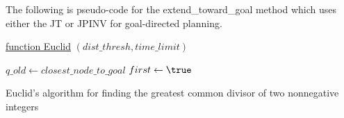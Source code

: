 \documentclass[conference]{IEEEtran} \usepackage[T1]{fontenc} \usepackage[backend=biber, style=ieee]{biblatex}
\begin{document}
The following is pseudo-code for the extend\_toward\_goal method which uses either the JT or JPINV for goal-directed planning.

\begin{algorithm}

    \underline{function Euclid} $(dist\_thresh, time\_limit)$\;

     \State $\mathit{q\_old} \gets closest\_node\_to\_goal$
     \State $first\gets\true$

    \caption{Euclid's algorithm for finding the greatest common divisor of two nonnegative integers}
\end{algorithm}

       
\end{document}
